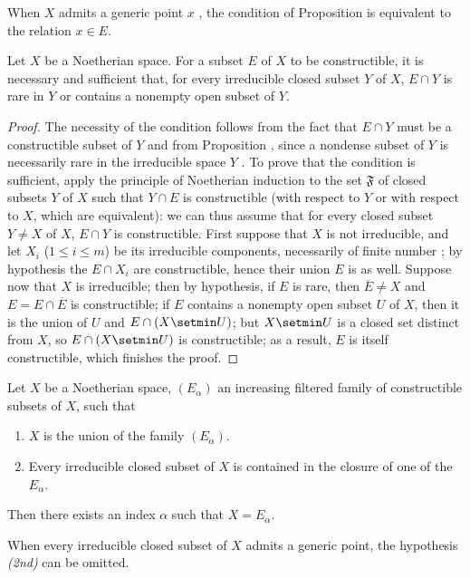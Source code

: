 When $X$ admits a generic point $x$ , the condition of Proposition  is equivalent to the relation $x\in E$.

\begin{proposition}[9.2.3]
\label{0.9.2.3}
Let $X$ be a Noetherian space.
For a subset $E$ of $X$ to be constructible, it is necessary and sufficient that, for every irreducible closed subset $Y$ of $X$, $E\cap Y$ is rare in $Y$ or contains a nonempty open subset of $Y$.
\end{proposition}

\begin{proof}
The necessity of the condition follows from the fact that $E\cap Y$ must be a constructible subset of $Y$ and from Proposition , since a nondense subset of $Y$ is necessarily rare in the irreducible space $Y$ .
To prove that the condition is sufficient, apply the principle of Noetherian induction  to the set $\mathfrak{F}$ of closed subsets $Y$ of $X$ such that $Y\cap E$ is constructible (with respect to $Y$ or with respect to $X$, which are equivalent): we can thus assume that for every closed subset $Y\neq X$ of $X$, $E\cap Y$ is constructible.
First suppose that $X$ is not irreducible, and let $X_i$ ($1\leq i\leq m$) be its irreducible components, necessarily of finite number ; by hypothesis the $E\cap X_i$ are constructible, hence their union $E$ is as well.
Suppose now that $X$ is irreducible; then by hypothesis, if $E$ is rare, then $\overline{E}\neq X$ and $E=E\cap\overline{E}$ is constructible; if $E$ contains a nonempty open subset $U$ of $X$, then it is the union of $U$ and $E\cap(X\setmin U)$; but $X\setmin U$ is a closed set distinct from $X$, so $E\cap(X\setmin U)$ is constructible; as a result, $E$ is itself constructible, which finishes the proof.
\end{proof}

\begin{corollary}[9.2.4]
\label{0.9.2.4}
Let $X$ be a Noetherian space, $(E_\alpha)$ an increasing filtered family of constructible subsets of $X$, such that
\begin{enumerate}
  \item[\emph{(1st)}] $X$ is the union of the family $(E_\alpha)$.
  \item[\emph{(2nd)}] Every irreducible closed subset of $X$ is contained in the closure of one of the $E_\alpha$.
\end{enumerate}

Then there exists an index $\alpha$ such that $X=E_\alpha$.

When every irreducible closed subset of $X$ admits a generic point, the hypothesis \emph{(2nd)} can be omitted.
\end{corollary}

